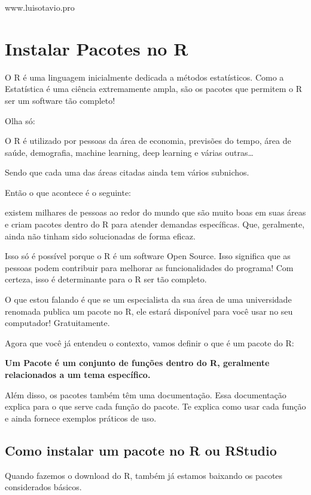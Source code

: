 \documentclass[
]{book}
\begin{document}
www.luisotavio.pro

\hypertarget{instalar-pacotes-no-r}{%
\chapter{Instalar Pacotes no R}\label{instalar-pacotes-no-r}}

O R é uma linguagem inicialmente dedicada a métodos estatísticos. Como a
Estatística é uma ciência extremamente ampla, são os pacotes que
permitem o R ser um software tão completo!

Olha só:

O R é utilizado por pessoas da área de economia, previsões do tempo,
área de saúde, demografia, machine learning, deep learning e várias
outras\ldots{}

Sendo que cada uma das áreas citadas ainda tem vários subnichos.

Então o que acontece é o seguinte:

existem milhares de pessoas ao redor do mundo que são muito boas em suas
áreas e criam pacotes dentro do R para atender demandas específicas.
Que, geralmente, ainda não tinham sido solucionadas de forma eficaz.

Isso só é possível porque o R é um software Open Source. Isso significa
que as pessoas podem contribuir para melhorar as funcionalidades do
programa! Com certeza, isso é determinante para o R ser tão completo.

O que estou falando é que se um especialista da sua área de uma
universidade renomada publica um pacote no R, ele estará disponível para
você usar no seu computador! Gratuitamente.

Agora que você já entendeu o contexto, vamos definir o que é um pacote
do R:

\textbf{Um Pacote é um conjunto de funções dentro do R, geralmente
relacionados a um tema específico.}

Além disso, os pacotes também têm uma documentação. Essa documentação
explica para o que serve cada função do pacote. Te explica como usar
cada função e ainda fornece exemplos práticos de uso.

\hypertarget{como-instalar-um-pacote-no-r-ou-rstudio}{%
\section{Como instalar um pacote no R ou
RStudio}\label{como-instalar-um-pacote-no-r-ou-rstudio}}

Quando fazemos o download do R, também já estamos baixando os pacotes
considerados básicos.
\end{document}
